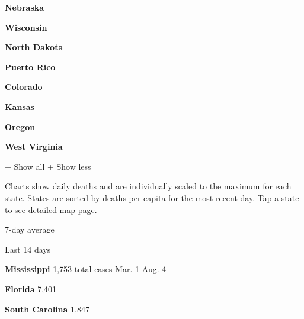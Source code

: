 \href{https://www.nytimes.com/interactive/2020/us/nebraska-coronavirus-cases.html}{}

\textbf{Nebraska}

\href{https://www.nytimes.com/interactive/2020/us/wisconsin-coronavirus-cases.html}{}

\textbf{Wisconsin}

\href{https://www.nytimes.com/interactive/2020/us/north-dakota-coronavirus-cases.html}{}

\textbf{North Dakota}

\href{https://www.nytimes.com/interactive/2020/us/puerto-rico-coronavirus-cases.html}{}

\textbf{Puerto Rico}

\href{https://www.nytimes.com/interactive/2020/us/colorado-coronavirus-cases.html}{}

\textbf{Colorado}

\href{https://www.nytimes.com/interactive/2020/us/kansas-coronavirus-cases.html}{}

\textbf{Kansas}

\href{https://www.nytimes.com/interactive/2020/us/oregon-coronavirus-cases.html}{}

\textbf{Oregon}

\href{https://www.nytimes.com/interactive/2020/us/west-virginia-coronavirus-cases.html}{}

\textbf{West Virginia}

+ Show all + Show less

Charts show daily deaths and are individually scaled to the maximum for
each state. States are sorted by deaths per capita for the most recent
day. Tap a state to see detailed map page.

\href{https://www.nytimes.com/interactive/2020/us/mississippi-coronavirus-cases.html}{}

7-day average

Last 14 days

\textbf{Mississippi} 1,753 total cases Mar. 1 Aug. 4

\href{https://www.nytimes.com/interactive/2020/us/florida-coronavirus-cases.html}{}

\textbf{Florida} 7,401

\href{https://www.nytimes.com/interactive/2020/us/south-carolina-coronavirus-cases.html}{}

\textbf{South Carolina} 1,847

\href{https://www.nytimes.com/interactive/2020/us/louisiana-coronavirus-cases.html}{}

